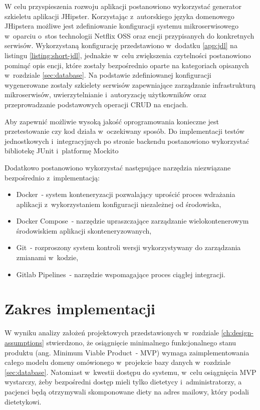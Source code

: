 \par
W celu przyspieszenia rozwoju aplikacji postanowiono wykorzystać generator szkieletu aplikacji JHipster\cite{tech:jhipster}.
Korzystając z~autorskiego języka domenowego JHipstera możliwe jest zdefiniowanie konfiguracji systemu mikroserwisowego w~oparciu o~stos technologii Netflix OSS oraz encji przypisanych do konkretnych serwisów.
Wykorzystaną konfigurację przedstawiono w~dodatku \ref{app:jdl} na listingu \ref{listing:short-jdl}, jednakże w~celu zwiększenia czytelności postanowiono pominąć opis encji, które zostały bezpośrednio oparte na kategoriach opisanych w~rozdziale \ref{sec:database}.
Na podstawie zdefiniowanej konfiguracji wygenerowane zostały szkielety serwisów zapewniające zarządzanie infrastrukturą mikroserwisów, uwierzytelnianie i~autoryzację użytkowników oraz przeprowadzanie podstawowych operacji CRUD na encjach.

\par
Aby zapewnić możliwie wysoką jakość oprogramowania konieczne jest przetestowanie czy kod działa w~oczekiwany sposób.
Do implementacji testów jednostkowych i~integracyjnych po stronie backendu postanowiono wykorzystać bibliotekę JUnit\cite{tech:junit} i~platformę Mockito\cite{tech:mockito}
\par
Dodatkowo postanowiono wykorzystać następujące narzędzia niezwiązane bezpośrednio z~implementacją:
\begin{itemize}
    \item Docker\cite{tech:docker}~- system konteneryzacji pozwalający uprościć proces wdrażania aplikacji z~wykorzystaniem konfiguracji niezależnej od środowiska,
    \item Docker Compose\cite{tech:docker-compose}~- narzędzie upraszczające zarządzanie wielokontenerowym środowiskiem aplikacji skonteneryzowanych,
    \item Git\cite{tech:git}~- rozproszony system kontroli wersji wykorzystywany do zarządzania zmianami w~kodzie,
    \item Gitlab Pipelines\cite{tech:gitlab-pipelines}~- narzędzie wspomagające proces ciągłej integracji.
\end{itemize}

\section{Zakres implementacji}\label{sec:implementation-scope}

W wyniku analizy założeń projektowych przedstawionych w~rozdziale \ref{ch:design-assumptions} stwierdzono,
że osiągnięcie minimalnego funkcjonalnego stanu produktu (ang. Minimum Viable Product~- MVP)
wymaga zaimplementowania całego modelu domeny omówionego w~projekcie bazy danych w~rozdziale \ref{sec:database}.
Natomiast w~kwestii dostępu do systemu, w~celu osiągnięcia MVP wystarczy, żeby bezpośredni dostęp mieli tylko dietetycy i~administratorzy,
a pacjenci będą otrzymywali skomponowane diety na adres mailowy, który podali dietetykowi.

